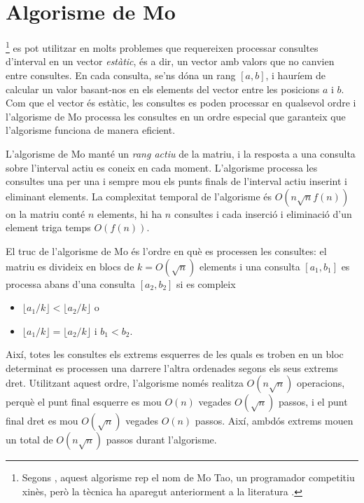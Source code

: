 \section{Algorisme de Mo}


\footnote{Segons \cite{cod15}, aquest algorisme
rep el nom de Mo Tao, un programador competitiu xinès, però la tècnica
ha aparegut anteriorment a la literatura \cite{ken06}.} es pot
utilitzar en molts problemes que requereixen processar consultes
d'interval en un vector \emph{estàtic}, és a dir, un vector amb valors que
no canvien entre consultes. En cada consulta, se'ns dóna un
rang $[a,b]$, i hauríem de calcular un valor basant-nos en els
elements del vector entre les posicions $a$ i $b$. Com que el vector
és estàtic, les consultes es poden processar en qualsevol ordre i
l'algorisme de Mo processa les consultes en un ordre especial que
garanteix que l'algorisme funciona de manera eficient.

L'algorisme de Mo manté un \emph{rang actiu} de la matriu, i la
resposta a una consulta sobre l'interval actiu es coneix en cada
moment. L'algorisme processa les consultes una per una i sempre mou
els punts finals de l'interval actiu inserint i eliminant elements. La
complexitat temporal de l'algorisme és $O(n \sqrt n f(n))$ on la matriu
conté $n$ elements, hi ha $n$ consultes i cada inserció i eliminació
d'un element triga temps $O(f(n))$.

El truc de l'algorisme de Mo és l'ordre en què es processen les
consultes: el matriu es divideix en blocs de $k=O(\sqrt n)$ elements i
una consulta $[a_1,b_1]$ es processa abans d'una consulta $ [a_2,b_2]$
si es compleix
\begin{itemize}
\item $\lfloor a_1/k \rfloor < \lfloor a_2/k \rfloor$ o
\item $\lfloor a_1/k \rfloor = \lfloor a_2/k \rfloor$ i $b_1 < b_2$.
\end{itemize}

Així, totes les consultes els extrems esquerres de les quals es troben
en un bloc determinat es processen una darrere l'altra ordenades
segons els seus extrems dret. Utilitzant aquest ordre, l'algorisme
només realitza $O(n \sqrt n)$ operacions, perquè el punt final
esquerre es mou $O(n)$ vegades $O(\sqrt n)$ passos, i el punt final
dret es mou $O(\sqrt n)$ vegades $O(n)$ passos. Així, ambdós extrems
mouen un total de $O(n \sqrt n)$ passos durant l'algorisme.

